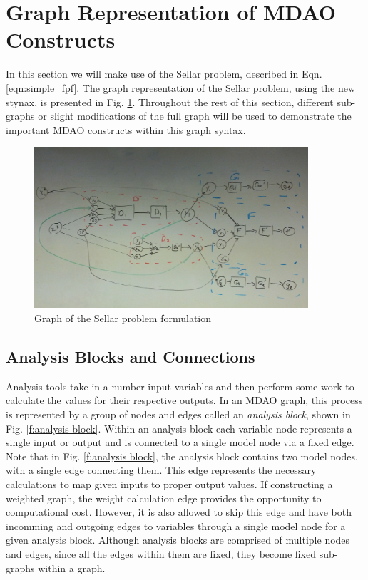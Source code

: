\section{Graph Representation of MDAO Constructs}
\label{s:graph representation}
In this section we will make use of the Sellar problem, described in 
Eqn. \ref{eqn:simple_fpf}. The graph representation of the Sellar problem, 
using the new stynax, is presented in Fig. \ref{f:sellar_graph_full}. Throughout
the rest of this section, different sub-graphs or slight modifications of 
the full graph will be used to demonstrate the important MDAO constructs within
this graph syntax.

\begin{figure}[htb!]
    \begin{center}
    \includegraphics[width=4in]{images/sellar_graph_full}
    \end{center}
    \vspace{-10pt}
\caption{Graph of the Sellar problem formulation}
\label{f:sellar_graph_full}
\end{figure}

\subsection{Analysis Blocks and Connections}
\label{ss:analysis blocks and connections}
Analysis tools take in a number input variables and then perform some work to calculate 
the values for their respective outputs. In an MDAO graph, this process is 
represented by a group of nodes and edges called an \emph{analysis block}, 
shown in Fig. \ref{f:analysis block}. Within an analysis block each variable 
node represents a single input or output and is connected 
to a single model node via a fixed edge. Note that in Fig. \ref{f:analysis block}, 
the analysis block contains two model nodes, with a single edge connecting them. 
This edge represents the necessary calculations to map given inputs 
to proper output values. If constructing a weighted graph, the weight calculation edge 
provides the opportunity to computational cost. However, it is also allowed to skip 
this edge and have both incomming and outgoing edges to variables through a single model 
node for a given analysis block. Although analysis blocks are comprised of multiple nodes and edges, since all 
the edges within them are fixed, they become fixed sub-graphs within a graph.

